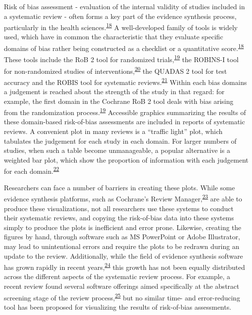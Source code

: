 \documentclass[a4paper, nobind]{templates/ociamthesis}
\begin{document}
Risk of bias assessment - evaluation of the internal validity of studies included in a systematic review - often forms a key part of the evidence synthesis process, particularly in the health sciences.\textsuperscript{\protect\hyperlink{ref-cochranechpt7}{18}} A well-developed family of tools is widely used, which have in common the characteristic that they evaluate specific domains of bias rather being constructed as a checklist or a quantitative score.\textsuperscript{\protect\hyperlink{ref-cochranechpt7}{18}} These tools include the RoB 2 tool for randomized trials,\textsuperscript{\protect\hyperlink{ref-sterne2019rob}{19}} the ROBINS-I tool for non-randomized studies of interventions,\textsuperscript{\protect\hyperlink{ref-sterne2016robins}{20}} the QUADAS 2 tool for test accuracy and the ROBIS tool for systematic reviews.\textsuperscript{\protect\hyperlink{ref-whiting2011quadas}{21}} Within each bias domains a judgement is reached about the strength of the study in that regard: for example, the first domain in the Cochrane RoB 2 tool deals with bias arising from the randomization process.\textsuperscript{\protect\hyperlink{ref-sterne2019rob}{19}} Accessible graphics summarizing the results of these domain-based risk-of-bias assessments are included in reports of systematic reviews. A convenient plot in many reviews is a ``traffic light'' plot, which tabulates the judgement for each study in each domain. For larger numbers of studies, when such a table become unmanageable, a popular alternative is a weighted bar plot, which show the proportion of information with each judgement for each domain.\textsuperscript{\protect\hyperlink{ref-higgins2008assessing}{22}}

Researchers can face a number of barriers in creating these plots. While some evidence synthesis platforms, such as Cochrane's Review Manager,\textsuperscript{\protect\hyperlink{ref-cochrane2014review}{23}} are able to produce these visualizations, not all researchers use these systems to conduct their systematic reviews, and copying the risk-of-bias data into these systems simply to produce the plots is inefficient and error prone. Likewise, creating the figures by hand, through software such as MS PowerPoint or Adobe Illustrator, may lead to unintentional errors and require the plots to be redrawn during an update to the review. Additionally, while the field of evidence synthesis software has grown rapidly in recent years,\textsuperscript{\protect\hyperlink{ref-marshall2015systematic}{24}} this growth has not been equally distributed across the different aspects of the systematic review process. For example, a recent review found several software offerings aimed specifically at the abstract screening stage of the review process,\textsuperscript{\protect\hyperlink{ref-harrison2020software}{25}} but no similar time- and error-reducing tool has been proposed for visualizing the results of risk-of-bias assessments.
\end{document}
